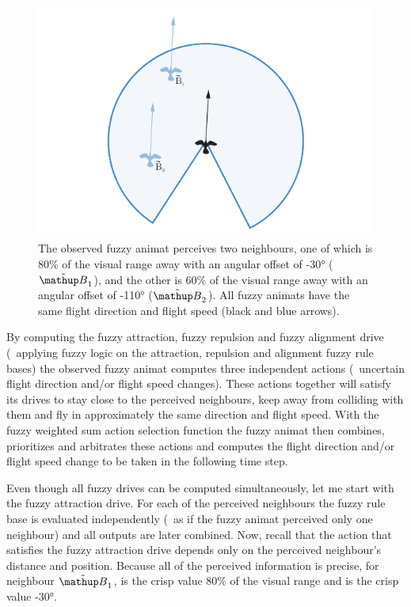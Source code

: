 \begin{figure}%
\includegraphics{fig[attractionFLSini]}
\caption{The observed fuzzy animat perceives two neighbours, one of which is 80\% of the visual range away with an angular offset of \ang{-30} ($\fautom{B}_1$), and the other is 60\% of the visual range away with an angular offset of \ang{-110} ($\fautom{B}_2$). All fuzzy animats have the same flight direction and flight speed (black and blue arrows).}
\label{fig:attraction:FLS:ini}
\end{figure}

By computing the fuzzy attraction, fuzzy repulsion and fuzzy alignment drive (\ie\ applying fuzzy logic on the attraction, repulsion and alignment fuzzy rule bases) the observed fuzzy animat computes three independent actions (\ie\ uncertain flight direction and/or flight speed changes). These actions together will satisfy its drives to stay close to the perceived neighbours, keep away from colliding with them and fly in approximately the same direction and flight speed. With the fuzzy weighted sum action selection function the fuzzy animat then combines, prioritizes and arbitrates these actions and computes the flight direction and/or flight speed change to be taken in the following time step. 

Even though all fuzzy drives can be computed simultaneously, let me start with the fuzzy attraction drive. For each of the perceived neighbours the fuzzy rule base is evaluated independently (\ie\ as if the fuzzy animat perceived only one neighbour) and all outputs are later combined. Now, recall that the action that satisfies the fuzzy attraction drive depends only on the perceived neighbour's distance and position. Because all of the perceived information is precise, for neighbour $\fautom{B}_1$,  is the crisp value 80\% of the visual range and  is the crisp value \ang{-30}. 

